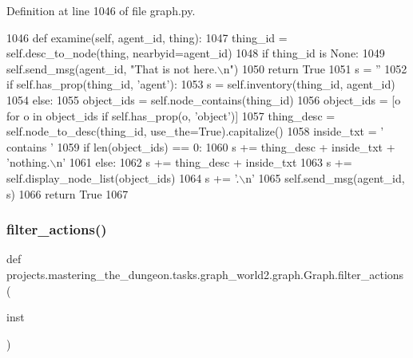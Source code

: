 Definition at line 1046 of file graph.\+py.


\begin{DoxyCode}
1046     \textcolor{keyword}{def }examine(self, agent\_id, thing):
1047         thing\_id = self.desc\_to\_node(thing, nearbyid=agent\_id)
1048         \textcolor{keywordflow}{if} thing\_id \textcolor{keywordflow}{is} \textcolor{keywordtype}{None}:
1049             self.send\_msg(agent\_id, \textcolor{stringliteral}{"That is not here.\(\backslash\)n"})
1050             \textcolor{keywordflow}{return} \textcolor{keyword}{True}
1051         s = \textcolor{stringliteral}{''}
1052         \textcolor{keywordflow}{if} self.has\_prop(thing\_id, \textcolor{stringliteral}{'agent'}):
1053             s = self.inventory(thing\_id, agent\_id)
1054         \textcolor{keywordflow}{else}:
1055             object\_ids = self.node\_contains(thing\_id)
1056             object\_ids = [o \textcolor{keywordflow}{for} o \textcolor{keywordflow}{in} object\_ids \textcolor{keywordflow}{if} self.has\_prop(o, \textcolor{stringliteral}{'object'})]
1057             thing\_desc = self.node\_to\_desc(thing\_id, use\_the=\textcolor{keyword}{True}).capitalize()
1058             inside\_txt = \textcolor{stringliteral}{' contains '}
1059             \textcolor{keywordflow}{if} len(object\_ids) == 0:
1060                 s += thing\_desc + inside\_txt + \textcolor{stringliteral}{'nothing.\(\backslash\)n'}
1061             \textcolor{keywordflow}{else}:
1062                 s += thing\_desc + inside\_txt
1063                 s += self.display\_node\_list(object\_ids)
1064                 s += \textcolor{stringliteral}{'.\(\backslash\)n'}
1065         self.send\_msg(agent\_id, s)
1066         \textcolor{keywordflow}{return} \textcolor{keyword}{True}
1067 
\end{DoxyCode}
\mbox{\label{classprojects_1_1mastering__the__dungeon_1_1tasks_1_1graph__world2_1_1graph_1_1Graph_aaeefec1f409cbe2ce0f4531c353264a6}} 
\subsubsection{\texorpdfstring{filter\+\_\+actions()}{filter\_actions()}}
{\footnotesize\ttfamily def projects.\+mastering\+\_\+the\+\_\+dungeon.\+tasks.\+graph\+\_\+world2.\+graph.\+Graph.\+filter\+\_\+actions (\begin{DoxyParamCaption}\item[{}]{inst }\end{DoxyParamCaption})\hspace{0.3cm}{\ttfamily [static]}}




